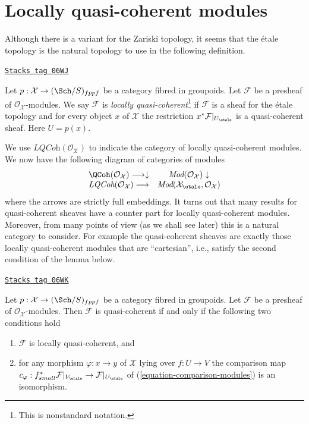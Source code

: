 \section{Locally quasi-coherent modules}
\label{stacks-sheaves-section-locally-quasi-coherent}
Although there is a variant for the Zariski topology, it seems
that the \'etale topology is the natural topology to use in the
following definition.

\begin{definition}
\label{stacks-sheaves-definition-locally-quasi-coherent}
\href{https://stacks.math.columbia.edu/tag/06WJ}{\texttt{Stacks tag 06WJ}}

Let $p : \mathcal{X} \to (\Sch/S)_{fppf}$ be a category
fibred in groupoids. Let $\mathcal{F}$
be a presheaf of $\mathcal{O}_\mathcal{X}$-modules.
We say $\mathcal{F}$ is {\it locally quasi-coherent}\footnote{This is
nonstandard notation.} if
$\mathcal{F}$ is a sheaf for the \'etale topology and
for every object $x$ of $\mathcal{X}$ the restriction
$x^*\mathcal{F}|_{U_\etale}$ is a quasi-coherent
sheaf. Here $U = p(x)$.
\end{definition}

We use $\textit{LQCoh}(\mathcal{O}_\mathcal{X})$ to indicate the category of
locally quasi-coherent modules. We now have the following diagram
of categories of modules
$$
\begin{array}{cc}\QCoh(\mathcal{O}_\mathcal{X}) \longrightarrow\downarrow & \textit{Mod}(\mathcal{O}_\mathcal{X}) \downarrow \\ \textit{LQCoh}(\mathcal{O}_\mathcal{X}) \longrightarrow & \textit{Mod}(\mathcal{X}_\etale, \mathcal{O}_\mathcal{X})\end{array}
$$
where the arrows are strictly full embeddings.
It turns out that many results for quasi-coherent sheaves have a
counter part for locally quasi-coherent modules. Moreover, from many
points of view (as we shall see later) this is a natural category to consider.
For example the quasi-coherent sheaves are exactly those
locally quasi-coherent modules that are ``cartesian'', i.e., satisfy
the second condition of the lemma below.

\begin{lemma}
\label{stacks-sheaves-lemma-quasi-coherent}
\href{https://stacks.math.columbia.edu/tag/06WK}{\texttt{Stacks tag 06WK}}

Let $p : \mathcal{X} \to (\Sch/S)_{fppf}$ be a category
fibred in groupoids. Let $\mathcal{F}$
be a presheaf of $\mathcal{O}_\mathcal{X}$-modules. Then $\mathcal{F}$
is quasi-coherent if and only if the following two conditions hold
\begin{enumerate}
\item $\mathcal{F}$ is locally quasi-coherent, and
\item for any morphism $\varphi : x \to y$ of $\mathcal{X}$ lying over
$f : U \to V$ the comparison map
$c_\varphi : f_{small}^*\mathcal{F}|_{V_\etale} \to
\mathcal{F}|_{U_\etale}$ of
(\ref{equation-comparison-modules}) is an isomorphism.
\end{enumerate}
\end{lemma}

